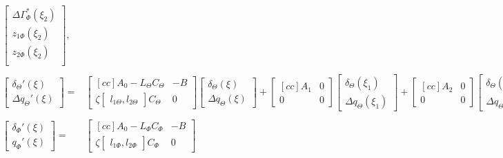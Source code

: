 \documentclass[main.tex]{subfiles}
\begin{document}
\begin{align}
\begin{bmatrix}
	\Delta \Gamma_\Phi^{*}(\xi_2) \\
	z_{1\Phi}(\xi_2) \\
	z_{2\Phi}(\xi_2) \\
	\end{bmatrix}, \label{eq:SynthesisConAzi}\\
	\nonumber\\
	\begin{bmatrix}
	\delta_\Theta  '(\xi) \\
	\Delta q_\Theta'(\xi)
	\end{bmatrix} =&
	\begin{bmatrix}[cc]
	A_0 - L_\Theta C_\Theta & -B\\ 
	\zeta \begin{bmatrix}l_{1\Theta} , l_{2\Theta}	\end{bmatrix} C_\Theta & 0
	\end{bmatrix}
	\begin{bmatrix}
	\delta_\Theta (\xi)\\
	\Delta q_\Theta (\xi)
	\end{bmatrix} + 
	\begin{bmatrix}[cc]
	A_1 & 0\\ 
	0 & 0
	\end{bmatrix}
	\begin{bmatrix}
	\delta_\Theta (\xi_1)\\
	\Delta q_\Theta (\xi_1)
	\end{bmatrix} + 
	\begin{bmatrix}[cc]
	A_2 & 0\\ 
	0 & 0
	\end{bmatrix}
	\begin{bmatrix}
	\delta_\Theta (\xi_2)\\
	\Delta q_\Theta (\xi_2)
	\end{bmatrix}, \label{eq:SynthesisObsInc}\\
    	\nonumber \\
    	\begin{bmatrix}
    	\delta_\Phi  '(\xi) \\
    	q_\Phi'(\xi)
    	\end{bmatrix} =&
    	\begin{bmatrix}[cc]
    	A_0 - L_\Phi C_\Phi & -B\\ 
    	\zeta \begin{bmatrix}l_{1\Phi} , l_{2\Phi}	\end{bmatrix} C_\Phi & 0
    	\end{bmatrix}

\end{align}
\end{document}
